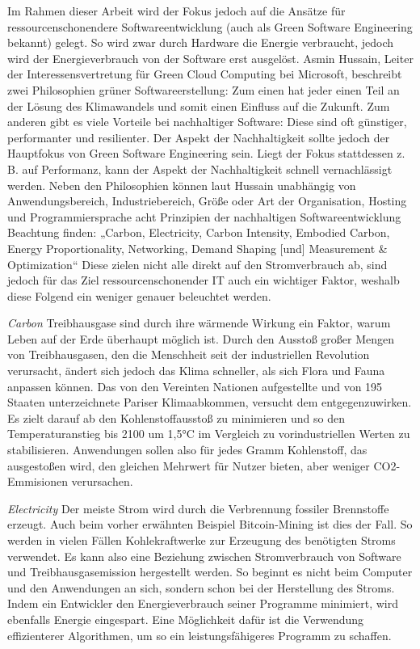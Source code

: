 \documentclass[utf8,biblatex]{lni}
\begin{document}
Im Rahmen dieser Arbeit wird der Fokus jedoch auf die Ansätze für ressourcenschonendere Softwareentwicklung (auch als Green Software Engineering bekannt) gelegt. So wird zwar durch Hardware die Energie verbraucht, jedoch wird der Energieverbrauch von der Software erst ausgelöst. Asmin Hussain, Leiter der Interessensvertretung für Green Cloud Computing bei Microsoft, beschreibt zwei Philosophien grüner Softwareerstellung: Zum einen hat jeder einen Teil an der Lösung des Klimawandels und somit einen Einfluss auf die Zukunft. Zum anderen gibt es viele Vorteile bei nachhaltiger Software: Diese sind oft günstiger, performanter und resilienter. Der Aspekt der Nachhaltigkeit sollte jedoch der Hauptfokus von Green Software Engineering sein. Liegt der Fokus stattdessen z. B. auf Performanz, kann der Aspekt der Nachhaltigkeit schnell vernachlässigt werden. Neben den Philosophien können laut Hussain unabhängig von Anwendungsbereich, Industriebereich, Größe oder Art der Organisation, Hosting und Programmiersprache acht Prinzipien der nachhaltigen Softwareentwicklung Beachtung finden: „Carbon, Electricity, Carbon Intensity, Embodied Carbon, Energy Proportionality, Networking, Demand Shaping [und] Measurement \& Optimization“ \cite{Principles21} Diese zielen nicht alle direkt auf den Stromverbrauch ab, sind jedoch für das Ziel ressourcenschonender IT auch ein wichtiger Faktor, weshalb diese Folgend ein weniger genauer beleuchtet werden.

\textit{Carbon} \newline
Treibhausgase sind durch ihre wärmende Wirkung ein Faktor, warum Leben auf der Erde überhaupt möglich ist. Durch den Ausstoß großer Mengen von Treibhausgasen, den die Menschheit seit der industriellen Revolution verursacht, ändert sich jedoch das Klima schneller, als sich Flora und Fauna anpassen können. Das von den Vereinten Nationen aufgestellte und von 195 Staaten unterzeichnete Pariser Klimaabkommen, versucht dem entgegenzuwirken. Es zielt darauf ab den Kohlenstoffausstoß zu minimieren und so den Temperaturanstieg bis 2100 um 1,5°C im Vergleich zu vorindustriellen Werten zu stabilisieren. Anwendungen sollen also für jedes Gramm Kohlenstoff, das ausgestoßen wird, den gleichen Mehrwert für Nutzer bieten, aber weniger CO2-Emmisionen verursachen.

\textit{Electricity} \newline
Der meiste Strom wird durch die Verbrennung fossiler Brennstoffe erzeugt. Auch beim vorher erwähnten Beispiel Bitcoin-Mining ist dies der Fall. So werden in vielen Fällen Kohlekraftwerke zur Erzeugung des benötigten Stroms verwendet. Es kann also eine Beziehung zwischen Stromverbrauch von Software und Treibhausgasemission hergestellt werden. So beginnt es nicht beim Computer und den Anwendungen an sich, sondern schon bei der Herstellung des Stroms. Indem ein Entwickler den Energieverbrauch seiner Programme minimiert, wird ebenfalls Energie eingespart. Eine Möglichkeit dafür ist die Verwendung effizienterer Algorithmen, um so ein leistungsfähigeres Programm zu schaffen. \cite{Principles21}
\end{document}
